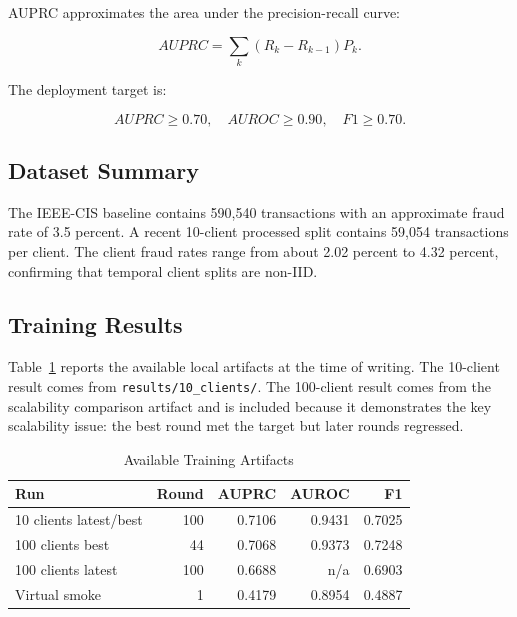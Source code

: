 \documentclass[conference]{IEEEtran}
\begin{document}
AUPRC approximates the area under the precision-recall curve:

\begin{equation}
AUPRC=\sum_k(R_k-R_{k-1})P_k.
\end{equation}

The deployment target is:

\begin{equation}
AUPRC\geq0.70,\quad AUROC\geq0.90,\quad F1\geq0.70.
\end{equation}

\subsection{Dataset Summary}

The IEEE-CIS baseline contains 590,540 transactions with an approximate fraud
rate of 3.5 percent. A recent 10-client processed split contains 59,054
transactions per client. The client fraud rates range from about 2.02 percent
to 4.32 percent, confirming that temporal client splits are non-IID.

\subsection{Training Results}

Table~\ref{tab:results} reports the available local artifacts at the time of
writing. The 10-client result comes from \texttt{results/10\_clients/}. The
100-client result comes from the scalability comparison artifact and is included
because it demonstrates the key scalability issue: the best round met the target
but later rounds regressed.

\begin{table}[t]
\caption{Available Training Artifacts}
\label{tab:results}
\centering
\begin{tabular}{lrrrr}
\toprule
\textbf{Run} & \textbf{Round} & \textbf{AUPRC} & \textbf{AUROC} & \textbf{F1} \\
\midrule
10 clients latest/best & 100 & 0.7106 & 0.9431 & 0.7025 \\
100 clients best & 44 & 0.7068 & 0.9373 & 0.7248 \\
100 clients latest & 100 & 0.6688 & n/a & 0.6903 \\
Virtual smoke & 1 & 0.4179 & 0.8954 & 0.4887 \\
\bottomrule
\end{tabular}
\end{table}
\end{document}
